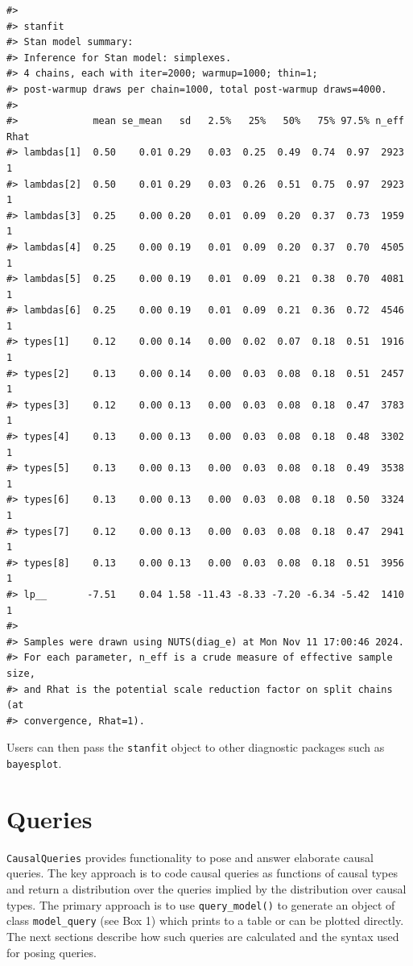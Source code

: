 \documentclass[
  11pt,
  article]{jss}
\begin{document}
\begin{verbatim}
#> 
#> stanfit
#> Stan model summary:
#> Inference for Stan model: simplexes.
#> 4 chains, each with iter=2000; warmup=1000; thin=1; 
#> post-warmup draws per chain=1000, total post-warmup draws=4000.
#> 
#>             mean se_mean   sd   2.5%   25%   50%   75% 97.5% n_eff Rhat
#> lambdas[1]  0.50    0.01 0.29   0.03  0.25  0.49  0.74  0.97  2923    1
#> lambdas[2]  0.50    0.01 0.29   0.03  0.26  0.51  0.75  0.97  2923    1
#> lambdas[3]  0.25    0.00 0.20   0.01  0.09  0.20  0.37  0.73  1959    1
#> lambdas[4]  0.25    0.00 0.19   0.01  0.09  0.20  0.37  0.70  4505    1
#> lambdas[5]  0.25    0.00 0.19   0.01  0.09  0.21  0.38  0.70  4081    1
#> lambdas[6]  0.25    0.00 0.19   0.01  0.09  0.21  0.36  0.72  4546    1
#> types[1]    0.12    0.00 0.14   0.00  0.02  0.07  0.18  0.51  1916    1
#> types[2]    0.13    0.00 0.14   0.00  0.03  0.08  0.18  0.51  2457    1
#> types[3]    0.12    0.00 0.13   0.00  0.03  0.08  0.18  0.47  3783    1
#> types[4]    0.13    0.00 0.13   0.00  0.03  0.08  0.18  0.48  3302    1
#> types[5]    0.13    0.00 0.13   0.00  0.03  0.08  0.18  0.49  3538    1
#> types[6]    0.13    0.00 0.13   0.00  0.03  0.08  0.18  0.50  3324    1
#> types[7]    0.12    0.00 0.13   0.00  0.03  0.08  0.18  0.47  2941    1
#> types[8]    0.13    0.00 0.13   0.00  0.03  0.08  0.18  0.51  3956    1
#> lp__       -7.51    0.04 1.58 -11.43 -8.33 -7.20 -6.34 -5.42  1410    1
#> 
#> Samples were drawn using NUTS(diag_e) at Mon Nov 11 17:00:46 2024.
#> For each parameter, n_eff is a crude measure of effective sample size,
#> and Rhat is the potential scale reduction factor on split chains (at 
#> convergence, Rhat=1).
\end{verbatim}

Users can then pass the \texttt{stanfit} object to other diagnostic
packages such as \texttt{bayesplot}.

\section{Queries}\label{sec-query}

\texttt{CausalQueries} provides functionality to pose and answer
elaborate causal queries. The key approach is to code causal queries as
functions of causal types and return a distribution over the queries
implied by the distribution over causal types. The primary approach is
to use \texttt{query\_model()} to generate an object of class
\texttt{model\_query} (see Box 1) which prints to a table or can be
plotted directly. The next sections describe how such queries are
calculated and the syntax used for posing queries.
\end{document}
